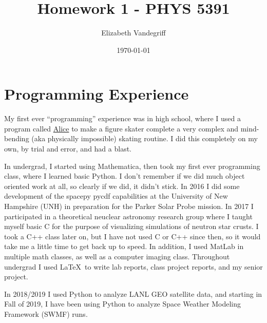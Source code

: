 \documentclass[12pt, letterpaper]{article}
\begin{document}
\title{Homework 1 - PHYS 5391}
\author{Elizabeth Vandegriff}
\date{\today}

\maketitle
\newpage
\tableofcontents
\newpage

\section{Programming Experience}


My first ever ``programming'' experience was in high school, where I  used a program called \href{https://www.alice.org/}{Alice} to make a figure skater complete a very complex and mind-bending (aka physically impossible) skating routine. I did this completely on my own, by trial and error, and had a blast.

In undergrad, I started using Mathematica, then took my first ever programming class, where I learned basic Python. I don't remember if we did much object oriented work at all, so clearly if we did, it didn't stick. In 2016 I did some development of the spacepy pycdf capabilities at the University of New Hampshire (UNH) in preparation for the Parker Solar Probe mission. In 2017 I participated in a theoretical neuclear astronomy research group where I taught myself basic C for the purpose of visualizing simulations of neutron star crusts. I took a C++ class later on, but I have not used C or C++ since then, so it would take me a little time to get back up to speed. In addition, I used MatLab in multiple math classes, as well as a computer imaging class. Throughout undergrad I used \LaTeX\ to write lab reports, class project reports, and my senior project.

In 2018/2019 I used Python to analyze LANL GEO satellite data, and starting in Fall of 2019, I have been using Python to analyze Space Weather Modeling Framework (SWMF) runs.
\end{document}
